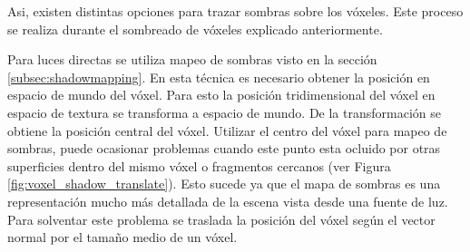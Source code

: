 Asi, existen distintas opciones para trazar sombras sobre los vóxeles. Este proceso se realiza durante el sombreado de vóxeles explicado anteriormente. 

Para luces directas se utiliza mapeo de sombras visto en la sección \ref{subsec:shadowmapping}. En esta técnica es necesario obtener la posición en espacio de mundo del vóxel. Para esto la posición tridimensional del vóxel en espacio de textura se transforma a espacio de mundo. De la transformación se obtiene la posición central del vóxel. Utilizar el centro del vóxel para mapeo de sombras, puede ocasionar problemas cuando este punto esta ocluido por otras superficies dentro del mismo vóxel o fragmentos cercanos (ver Figura \ref{fig:voxel_shadow_translate}). Esto sucede ya que el mapa de sombras es una representación mucho más detallada de la escena vista desde una fuente de luz. Para solventar este problema se traslada la posición del vóxel según el vector normal por el tamaño medio de un vóxel.

